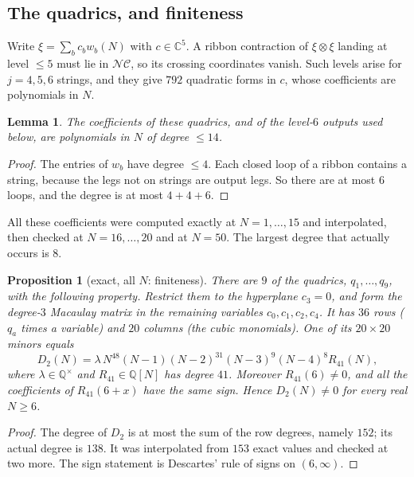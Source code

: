 \documentclass[11pt]{amsart}
\newtheorem{proposition}[theorem]{Proposition}
\newtheorem{lemma}[theorem]{Lemma}
\theoremstyle{definition}
\theoremstyle{remark}
\theoremstyle{plain}
\numberwithin{equation}{section}
\numberwithin{table}{section}
\newcommand{\C}{\mathbb C}
\newcommand{\Q}{\mathbb Q}
\newcommand{\NC}{\mathcal{NC}}
\begin{document}
\subsection{The quadrics, and finiteness}

Write $\xi=\sum_bc_bw_b(N)$ with $c\in\C^5$. A ribbon contraction of $\xi\otimes\xi$ landing at level $\le5$ must lie in $\NC$, so its crossing coordinates vanish. Such levels arise for $j=4,5,6$ strings, and they give $792$ quadratic forms in $c$, whose coefficients are polynomials in $N$.

\begin{lemma}\label{lem:deg}
The coefficients of these quadrics, and of the level-$6$ outputs used below, are polynomials in $N$ of degree $\le14$.
\end{lemma}

\begin{proof}
The entries of $w_b$ have degree $\le4$. Each closed loop of a ribbon contains a string, because the legs not on strings are output legs. So there are at most $6$ loops, and the degree is at most $4+4+6$.
\end{proof}

All these coefficients were computed exactly at $N=1,\dots,15$ and interpolated, then checked at $N=16,\dots,20$ and at $N=50$. The largest degree that actually occurs is $8$.

\begin{proposition}[exact, all $N$: finiteness]\label{prop:finite}
There are $9$ of the quadrics, $q_1,\dots,q_9$, with the following property. Restrict them to the hyperplane $c_3=0$, and form the degree-$3$ Macaulay matrix in the remaining variables $c_0,c_1,c_2,c_4$. It has $36$ rows ($q_a$ times a variable) and $20$ columns (the cubic monomials). One of its $20\times20$ minors equals
\[
D_2(N)=\lambda\,N^{48}(N-1)(N-2)^{31}(N-3)^{9}(N-4)^{8}R_{41}(N),
\]
where $\lambda\in\Q^\times$ and $R_{41}\in\Q[N]$ has degree $41$. Moreover $R_{41}(6)\ne0$, and all the coefficients of $R_{41}(6+x)$ have the same sign. Hence $D_2(N)\ne0$ for every real $N\ge6$.
\end{proposition}

\begin{proof}
The degree of $D_2$ is at most the sum of the row degrees, namely $152$; its actual degree is $138$. It was interpolated from $153$ exact values and checked at two more. The sign statement is Descartes' rule of signs on $(6,\infty)$.
\end{proof}
\end{document}

